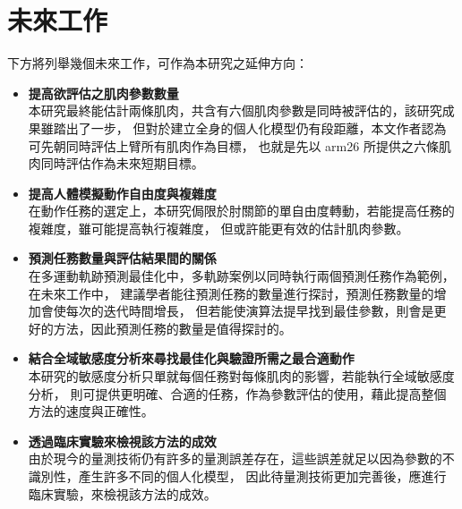\section{未來工作}
下方將列舉幾個未來工作，可作為本研究之延伸方向：

\begin{itemize}
    \item \textbf{提高欲評估之肌肉參數數量}
    \\ 本研究最終能估計兩條肌肉，共含有六個肌肉參數是同時被評估的，該研究成果雖踏出了一步，
    但對於建立全身的個人化模型仍有段距離，本文作者認為可先朝同時評估上臂所有肌肉作為目標，
    也就是先以 arm26 所提供之六條肌肉同時評估作為未來短期目標。
    \item \textbf{提高人體模擬動作自由度與複雜度}
    \\ 在動作任務的選定上，本研究侷限於肘關節的單自由度轉動，若能提高任務的複雜度，雖可能提高執行複雜度，
    但或許能更有效的估計肌肉參數。
    \item \textbf{預測任務數量與評估結果間的關係}
    \\ 在多運動軌跡預測最佳化中，多軌跡案例以同時執行兩個預測任務作為範例，在未來工作中，
    建議學者能往預測任務的數量進行探討，預測任務數量的增加會使每次的迭代時間增長，
    但若能使演算法提早找到最佳參數，則會是更好的方法，因此預測任務的數量是值得探討的。
    \item \textbf{結合全域敏感度分析來尋找最佳化與驗證所需之最合適動作}
    \\ 本研究的敏感度分析只單就每個任務對每條肌肉的影響，若能執行全域敏感度分析，
    則可提供更明確、合適的任務，作為參數評估的使用，藉此提高整個方法的速度與正確性。
    \item \textbf{透過臨床實驗來檢視該方法的成效}
    \\ 由於現今的量測技術仍有許多的量測誤差存在，這些誤差就足以因為參數的不識別性，產生許多不同的個人化模型，
    因此待量測技術更加完善後，應進行臨床實驗，來檢視該方法的成效。
\end{itemize}

\clearpage